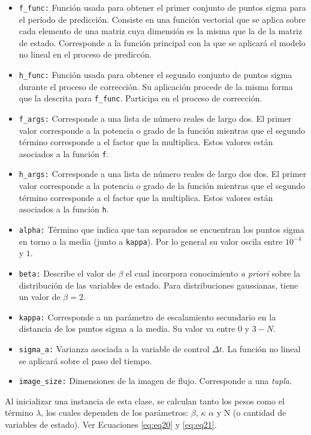\begin{itemize}
\item \texttt{f\_func:} Funci\'on usada para obtener el primer conjunto de puntos sigma para el per\'iodo de predicci\'on. Consiste en una funci\'on vectorial que se aplica sobre cada elemento de una matriz cuya dimensi\'on es la misma que la de la matriz de estado. Corresponde a la funci\'on principal con la que se aplicar\'a el modelo no lineal en el proceso de predicc\'on.
\item \texttt{h\_func:} Funci\'on usada para obtener el segundo conjunto de puntos sigma durante el proceso de correcci\'on. Su aplicaci\'on procede de la misma forma que la descrita para \texttt{f\_func}. Participa en el proceso de correcci\'on.
\item \texttt{f\_args:} Corresponde a una lista de n\'umero reales de largo dos. El primer valor corresponde a la potencia o grado de la funci\'on mientras que el segundo t\'ermino corresponde a el factor que la multiplica. Estos valores est\'an asociados a la funci\'on \texttt{f}.
\item \texttt{h\_args:} Corresponde a una lista de n\'umero reales de largo dos  dos. El primer valor corresponde a la potencia o grado de la funci\'on mientras que el segundo t\'ermino corresponde a el factor que la multiplica. Estos valores est\'an asociados a la funci\'on \texttt{h}.
\item \texttt{alpha:} T\'ermino que indica que tan separados se encuentran los puntos sigma en torno a la media (junto a \texttt{kappa}). Por lo general su valor oscila entre $10^{-4}$ y $1$. 
\item \texttt{beta:} Describe el valor de $\beta$ el cual incorpora conocimiento \textit{a priori} sobre la distribuci\'on de las variables de estado. Para distribuciones gaussianas, tiene un valor de $\beta=2$. 
\item \texttt{kappa:} Corresponde a un par\'ametro de escalamiento secundario en la distancia de los puntos sigma a la media. Su valor va entre $0$ y $3-N$.
\item \texttt{sigma\_a:} Varianza asociada a la variable de control $\Delta t$. La funci\'on no lineal se aplicar\'a sobre el paso del tiempo.
\item \texttt{image\_size:} Dimensiones de la imagen de flujo. Corresponde a una \textit{tupla}.
\end{itemize}

Al inicializar una instancia de esta clase, se calculan tanto los pesos como el t\'ermino $\lambda$, los cuales dependen de los par\'ametros: $\beta$, $\kappa$ $\alpha$ y N (o cantidad de variables de estado). Ver Ecuaciones \ref{eq:eq20} y \ref{eq:eq21}.
\bigskip

